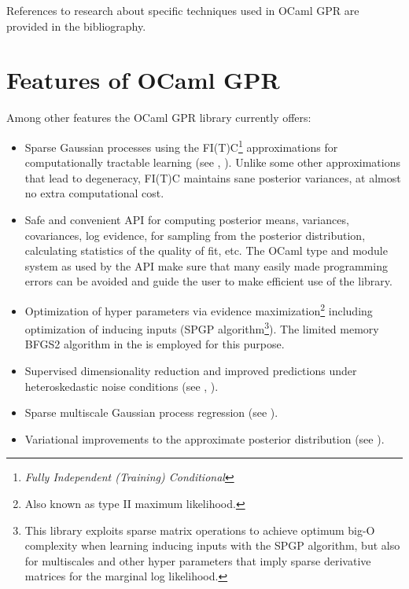\documentclass[10pt]{report}
\begin{document}
References to research about specific techniques used in OCaml GPR are provided
in the bibliography.

\section{Features of OCaml GPR}

Among other features the OCaml GPR library currently offers:

\begin{itemize}

\item Sparse Gaussian processes using the FI(T)C\footnote{\emph{Fully
Independent (Training) Conditional}} approximations for computationally
tractable learning (see \cite{conf/nips/2005}, \cite{SnelsonThesis}).  Unlike
some other approximations that lead to degeneracy, FI(T)C maintains sane
posterior variances, at almost no extra computational cost.

\item Safe and convenient API for computing posterior means, variances,
covariances, log evidence, for sampling from the posterior distribution,
calculating statistics of the quality of fit, etc.  The OCaml type and module
system as used by the API make sure that many easily made programming errors can
be avoided and guide the user to make efficient use of the library.

\item Optimization of hyper parameters via evidence maximization\footnote{Also
known as type II maximum likelihood.} including optimization of inducing inputs
(SPGP algorithm\footnote{This library exploits sparse matrix operations to
achieve optimum big-O complexity when learning inducing inputs with the SPGP
algorithm, but also for multiscales and other hyper parameters that imply sparse
derivative matrices for the marginal log likelihood.}).  The limited memory
BFGS2 algorithm in the  is employed for this purpose.

\item Supervised dimensionality reduction and improved predictions
under heteroskedastic noise conditions (see \cite{conf/uai/SnelsonG06},
\cite{SnelsonThesis}).

\item Sparse multiscale Gaussian process regression (see
\cite{conf/icml/WalderKS08}).

\item Variational improvements to the approximate posterior distribution (see
\cite{Titsias2009}).


\end{itemize}
\end{document}
